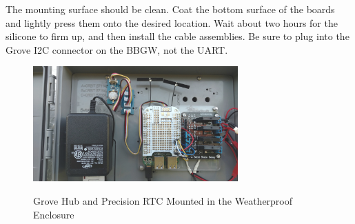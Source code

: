 The mounting surface should be clean.  Coat the bottom surface of the boards and lightly press them onto the desired location.  Wait about two hours for the silicone to firm up, and then install the cable assemblies.  Be sure to plug into the Grove I2C connector on the BBGW, not the UART.

\begin{figure}[H]
	\centering
	\includegraphics[width=0.7\textwidth]{photos/rtc-mounted}
	\centering\bfseries
	\caption{Grove Hub and Precision RTC Mounted in the Weatherproof Enclosure}
\end{figure}


